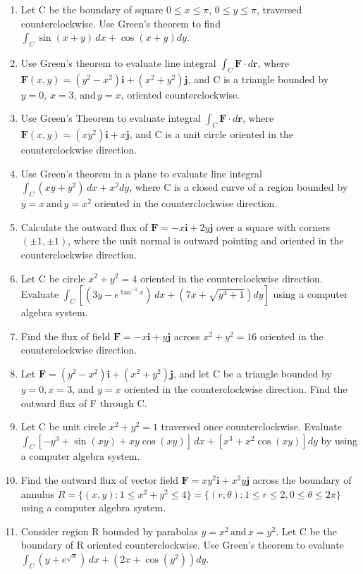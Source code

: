 \documentclass{exercises}
\begin{document}
\begin{enumerate}[resume]
\item Let C be the boundary of square $0\le x\le \pi,\,0\le y\le \pi$, traversed counterclockwise. Use Green's theorem to find $\int_{C}^{}\sin(x+y)\,dx+\cos(x+y)dy$.
\item Use Green's theorem to evaluate line integral $\int_{C}^{}\mathbf{F}\cdot d\mathbf{r}$, where $\mathbf{F}(x,y)=(y^{2}-x^{2})\mathbf{i}+(x^{2}+y^{2})\mathbf{j}$, and C is a triangle bounded by $y=0,\,x=3,\,\text{and}\,y=x$, oriented counterclockwise.
\item Use Green's Theorem to evaluate integral $\int_{C}^{}\mathbf{F}\cdot d\mathbf{r}$, where $\mathbf{F}(x,y)=(xy^{2})\mathbf{i}+x\mathbf{j}$, and C is a unit circle oriented in the counterclockwise direction.
\item Use Green's theorem in a plane to evaluate line integral $\int_{C}(xy+y^{2})\,dx+x^{2}dy$, where C is a closed curve of a region bounded by $y=x\,\text{and}\,y=x^{2}$ oriented in the counterclockwise direction.
\item Calculate the outward flux of $\mathbf{F}=-x\mathbf{i}+2y\mathbf{j}$ over a square with corners $(\pm1,\pm1)$, where the unit normal is outward pointing and oriented in the counterclockwise direction.
\item \techrequired Let C be circle $x^{2}+y^{2}=4$ oriented in the counterclockwise direction. Evaluate $\int_{C}[(3y-e^{\tan^{-1}x})\,dx+(7x+\sqrt{y^{4}+1})dy]$ using a computer algebra system.
\item Find the flux of field $\mathbf{F}=-x\mathbf{i}+y\mathbf{j}$ across $x^{2}+y^{2}=16$ oriented in the counterclockwise direction.
\item Let $\mathbf{F}=(y^{2}-x^{2})\mathbf{i}+(x^{2}+y^{2})\mathbf{j}$, and let C be a triangle bounded by $y=0,x=3$, and $y=x$ oriented in the counterclockwise direction. Find the outward flux of F through C.
\item \techrequired Let C be unit circle $x^{2}+y^{2}=1$ traversed once counterclockwise. Evaluate $\int_{C}[-y^{3}+\sin(xy)+xy\cos(xy)]\,dx+[x^{3}+x^{2}\cos(xy)]dy$ by using a computer algebra system.
\item \techrequired Find the outward flux of vector field $\mathbf{F}=xy^{2}\mathbf{i}+x^{2}y\mathbf{j}$ across the boundary of annulus $R=\{(x,y):1\le x^{2}+y^{2}\le4\}=\{(r,\theta):1\le r\le2,0\le \theta \le2\pi \}$ using a computer algebra system.
\item Consider region R bounded by parabolas $y=x^{2}\,\text{and}\,x=y^{2}$. Let C be the boundary of R oriented counterclockwise. Use Green's theorem to evaluate $\int_{C}(y+e^{\sqrt{x}})\,dx+(2x+\cos(y^{2}))dy$.
\end{enumerate}
\end{document}
